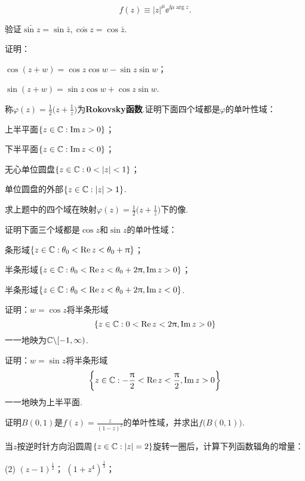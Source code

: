\begin{xiti}
\begin{enuma}
        \[
          f(z)\equiv |z|^\mu\ee^{\ii\mu\arg z}.
        \]
    \end{enuma}
  \item 验证$\bar{\sin z}=\sin\bar z,\bar{\cos z}=\cos\bar z$.
  \item 证明：
    \begin{enuma}
      \item $\cos(z+w) = \cos z\cos w-\sin z\sin w$；
      \item $\sin(z+w) = \sin z\cos w+\cos z\sin w$.
  \end{enuma}
  \item 称$\varphi(z)=\frac12\bigg(z+\frac1z\bigg)$为\textbf{Rokovsky函数}.证明下面四个域都是$\varphi$的单叶性域：
    \begin{enuma}
      \item 上半平面$\{z\in\mathbb C:\operatorname{Im} z>0\}$；
      \item 下半平面$\{z\in\mathbb C:\operatorname{Im} z<0\}$；
      \item 无心单位圆盘$\{z\in\MC:0<|z|<1\}$；
      \item 单位圆盘的外部$\{z\in\MC:|z|>1\}$.
    \end{enuma}
  \item 求上题中的四个域在映射$\varphi(z)=\frac12\bigg(z+\frac1z\bigg)$下的像.
  \item 证明下面三个域都是$\cos z$和$\sin z$的单叶性域：
    \begin{enuma}
      \item 条形域$\{z\in\mathbb C:\theta_0<\operatorname{Re} z<\theta_0+\uppi\}$；
      \item 半条形域$\{z\in\mathbb C:\theta_0<\operatorname{Re} z<\theta_0+2\uppi,\operatorname{Im} z>0\}$；
      \item 半条形域$\{z\in\mathbb C:\theta_0<\operatorname{Re} z<\theta_0+2\uppi,\operatorname{Im} z<0\}$.
    \end{enuma}
  \item 证明：$w=\cos z$将半条形域
    \[
      \{z\in\mathbb C: 0 < \operatorname{Re} z < 2\uppi, \operatorname{Im} z > 0\}
    \]
    一一地映为$\mathbb C\backslash[-1,\infty)$.
  \item 证明：$w=\sin z$将半条形域
    \[
      \bigg\{ z\in\mathbb C: -\frac{\uppi}2 < \operatorname{Re} z < \frac{\uppi}2,\operatorname{Im} z > 0 \bigg\}
    \]
    一一地映为上半平面.
  \item 证明$B(0,1)$是$f(z)=\frac z{(1-z)^2}$的单叶性域，并求出$f\big(B(0,1)\big)$.
  \item 当$z$按逆时针方向沿圆周$\{z\in\mathbb C:|z|=2\}$旋转一圈后，计算下列函数辐角的增量：
    \begin{tasks}(2)
      \task $(z-1)^{\frac12}$；
      \task $(1+z^4)^{\frac13}$；

\end{tasks}
\end{xiti}
